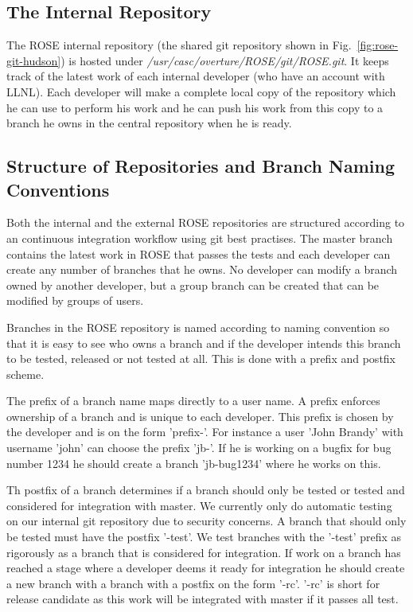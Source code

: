 \subsection{The Internal Repository}

The ROSE internal repository (the shared git repository shown in Fig.~\ref{fig:rose-git-hudson}) is hosted under \textit{/usr/casc/overture/ROSE/git/ROSE.git}.
It keeps track of the latest work of each
internal developer (who have an account with LLNL). Each
developer will make a complete local copy of the repository which he can use to
perform his work and he can push his work from this copy to a branch he owns in the 
central repository when he is ready. 

\subsection{Structure of Repositories and Branch Naming Conventions}


Both the internal and the external ROSE repositories are structured according to
an continuous integration workflow using git best practises. The master branch
contains the latest work in ROSE that passes the tests and each developer can
create any number of branches that he owns. No developer can modify
a branch owned by another developer, but a group branch can be created that 
can be modified by groups of users. 

Branches in the ROSE repository is named according to naming convention so that 
it is easy to see who owns a branch and if the developer intends this branch to
be tested, released or not tested at all. This is done with a prefix and postfix
scheme.

The prefix of a branch name maps directly to a user name. A prefix enforces 
ownership of a branch and is unique to each developer. This prefix is chosen
by the developer and is on the form 'prefix-'. For instance a user 'John Brandy' 
with username 'john' can choose the prefix 'jb-'. If he is working on a bugfix
for bug number 1234 he should create a branch 'jb-bug1234' where he works on this.

Th postfix of a branch determines if a branch should only be tested or tested and
considered for integration with master. We currently only do automatic testing on
our internal git repository due to security concerns. A branch that should only be 
tested must have the postfix '-test'. We test branches with the '-test' prefix as 
rigorously as a branch that is considered for integration. If work on a branch has
reached a stage where a developer deems it ready for integration he should create
a new branch with a branch with a postfix on the form '-rc'. '-rc' is short for
release candidate as this work will be integrated with master if it passes all test.

